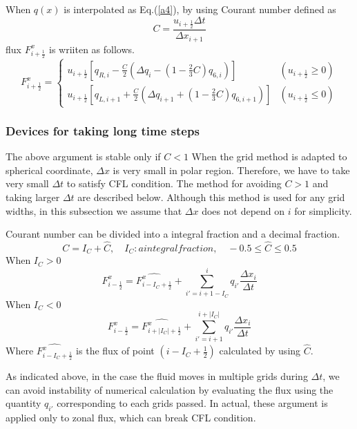 When $q(x)$ is interpolated as Eq.(\ref{a4}), by using Courant number defined as
\begin{equation}
  C=\frac{u_{i+\frac{1}{2}}\Delta t}{\Delta x_{i+1}}
\end{equation}
flux $F^{x}_{i+\frac{1}{2}}$ is wriiten as follows.
\begin{equation}
  F^{x}_{i+\frac{1}{2}}=\begin{cases}u_{i+\frac{1}{2}}[q_{R,i}-\frac{C}{2}(\Delta q_{i}-(1-\frac{2}{3}C)q_{6,i})] & (u_{i+\frac{1}{2}}\ge0)\\
  u_{i+\frac{1}{2}}[q_{L,i+1}+\frac{C}{2}(\Delta q_{i+1}+(1-\frac{2}{3}C)q_{6,i+1})] & (u_{i+\frac{1}{2}}\leq0)
  \end{cases}
\end{equation}
\subsubsection{Devices for taking long time steps}
The above argument is stable only if $C<1$
When the grid method is adapted to spherical coordinate, $\Delta x$ is very small in polar region.
Therefore, we have to take very small $\Delta t$ to satisfy CFL condition. 
The method for avoiding $C>1$ and taking larger $\Delta t$ are described below.
Although this method is used for any grid widths, in this subsection we assume that $\Delta x$ does not depend on $i$ for simplicity. 

Courant number can be divided into a integral fraction and a decimal fraction. 
\begin{equation}
  C=I_{C}+\hat{C},\quad I_{C}: a integral fraction,\quad -0.5\le \hat{C} \le 0.5
\end{equation}
When $I_{C}>0$
\begin{equation}
  F^{x}_{i-\frac{1}{2}}=\hat{F^{x}_{i-I_{C}+\frac{1}{2}}}+\sum^{i}_{i'=i+1-I_{C}} q_{i'} \frac{\Delta x_{i}}{\Delta t}
\end{equation}
When $I_{C}<0$
\begin{equation}
  F^{x}_{i-\frac{1}{2}}=\hat{F^{x}_{i+|I_{C}|+\frac{1}{2}}}+\sum^{i+|I_{C}|}_{i'=i+1} q_{i'} \frac{\Delta x_{i}}{\Delta t}
\end{equation}
Where $\hat{F^{x}_{i-I_{C}+\frac{1}{2}}}$ is the flux of point $(i-I_{C}+\frac{1}{2})$ calculated by using $\hat{C}$.

As indicated above, in the case the fluid moves in multiple grids during $\Delta t$, we can avoid instability of numerical calculation by evaluating the flux using the quantity $q_{i'}$ corresponding to each grids passed.
In actual, these argument is applied only to zonal flux, which can break CFL condition.

